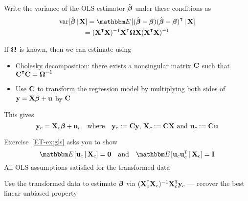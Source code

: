 \begin{frame}

    \vspace{2em}
    Write the variance of the OLS estimator
    $\hat {\boldsymbol \beta}$ under these conditions as
    \begin{multline*}
        \label{eq:genvar}
        \var [\hboldbeta \given \boldX]
        = \EE [ (\hboldbeta - \boldbeta)(\hboldbeta - \boldbeta)^\T \given \boldX]
        \\ = (\boldX^\T \boldX)^{-1} \boldX^\T \boldOmega  \boldX
            (\boldX^\T \boldX)^{-1}
    \end{multline*}
    
    \vspace{.7em}
    If ${\boldsymbol \Omega}$ is known, then we can estimate
    using 
 
    \begin{itemize}
        \item Cholesky decomposition:
        there exists a nonsingular matrix $\mathbf C$ such that $\boldC^\T \boldC =
        \boldOmega^{-1}$
        \item  Use $\mathbf C$ to transform the regression model by multiplying
            both sides of ${\mathbf y} = \mathbf X {\boldsymbol \beta} + {\mathbf u}$ by $\mathbf C$
    \end{itemize}
    
\end{frame}

\begin{frame}
    
    \vspace{2em}
    This gives
    \begin{equation*}
        {\mathbf y}_c = \mathbf X_c {\boldsymbol \beta} + {\mathbf u}_c  
        \quad \text{where} \quad
        {\mathbf y}_c := \mathbf C {\mathbf y}, \,
        \mathbf X_c := \mathbf C \mathbf X
        \text{ and } {\mathbf u}_c := \mathbf C {\mathbf u}
    \end{equation*}
    
    \vspace{.7em}
    Exercise~\ref{ET-ex:gls} asks you to show
    \begin{equation*}
    \label{eq:evug}
    \EE [ \boldu_c \given \boldX_c ] = \boldzero
    \quad \text{and} \quad
    \EE [ \boldu_c \boldu_c^\T \given \boldX_c ] = \boldI
    \end{equation*}
    All OLS assumptions
    satisfied for the transformed data
    
    Use the transformed data to
    estimate ${\boldsymbol \beta}$ via $(\boldX_c^\T \boldX_c)^{-1} \boldX_c^\T \boldy_c$ ---
    recover the best linear unbiased property
    

\end{frame}

